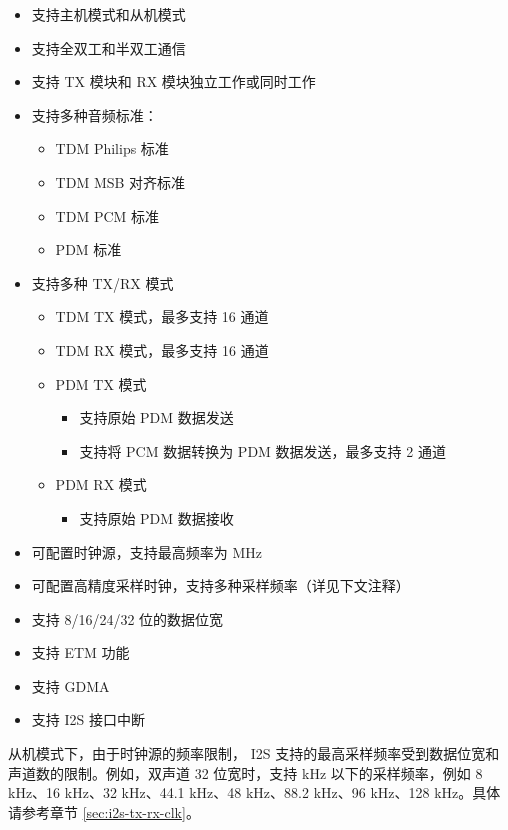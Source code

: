 \documentclass[main\_\_CN.tex]{subfiles}
\begin{document}
\begin{itemize}
    \item 支持主机模式和从机模式
    \item 支持全双工和半双工通信
    \item 支持 TX 模块和 RX 模块独立工作或同时工作
    \item 支持多种音频标准：
        \begin{itemize}    
            \item TDM Philips 标准
            \item TDM MSB 对齐标准
            \item TDM PCM 标准
            \item PDM 标准
        \end{itemize}
        \item 支持多种 TX/RX 模式
        \begin{itemize}
        \item TDM TX 模式，最多支持 16 通道
        \item TDM RX 模式，最多支持 16 通道
        \item PDM TX 模式
        \begin{itemize}
            \item 支持原始 PDM 数据发送
            \item 支持将 PCM 数据转换为 PDM 数据发送，最多支持 2 通道
        \end{itemize}
        \item PDM RX 模式
        \begin{itemize}
            \item 支持原始 PDM 数据接收
        \end{itemize}
        \end{itemize}
    \item 可配置时钟源，支持最高频率为  MHz
    \item 可配置高精度采样时钟，支持多种采样频率（详见下文注释）
    \item 支持 8/16/24/32 位的数据位宽
    \item 支持 ETM 功能
    \item 支持 GDMA
    \item 支持 I2S 接口中断
\end{itemize}

\begin{tiplisting}
从机模式下，由于时钟源的频率限制，\chipname{} I2S 支持的最高采样频率受到数据位宽和声道数的限制。例如，双声道 32 位宽时，支持  kHz 以下的采样频率，例如 8 kHz、16 kHz、32 kHz、44.1 kHz、48 kHz、88.2 kHz、96 kHz、128 kHz。具体请参考章节 \ref{sec:i2s-tx-rx-clk}。
\end{tiplisting}
\end{document}
